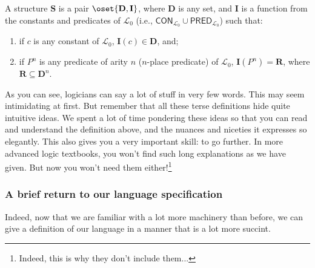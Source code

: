\begin{defn} \label{structure}
A structure $\mathbf{S}$ is a pair $\oset{\mathbf{D}, \mathbf{I}}$, where $\mathbf{D}$ is any set, and $\mathbf{I}$ is a function from the constants and predicates of $\mathcal{L}_0$ (i.e., $\mathsf{CON}_{\mathcal{L}_0} \cup \mathsf{PRED}_{\mathcal{L}_0}$) such that:
%
\begin{enumerate}
	\item if $c$ is any constant of $\mathcal{L}_0$, $\mathbf{I}(c) \in \mathbf{D}$, and;
	\item if $P^n$ is any predicate  of arity $n$ ($n$-place predicate) of $\mathcal{L}_0$, $\mathbf{I}(P^n)=\mathbf{R}$, where $\mathbf{R} \subseteq \mathbf{D}^n$. 
\end{enumerate}
\end{defn}

As you can see, logicians can say a lot of stuff in very few words. This may seem intimidating at first. But remember that all these terse definitions hide quite intuitive ideas. We spent a lot of time pondering these ideas so that you can read and understand the definition above, and the nuances and niceties it expresses so elegantly. This also gives you a very important skill: to go further. In more advanced logic textbooks, you won't find such long explanations as we have given. But now you won't need them either!\footnote{Indeed, this is why they don't include them...}

\subsubsection{A brief return to our language specification}

Indeed, now that we are familiar with a lot more machinery than before, we can give a definition of our language in a manner that is a lot more succint. 

